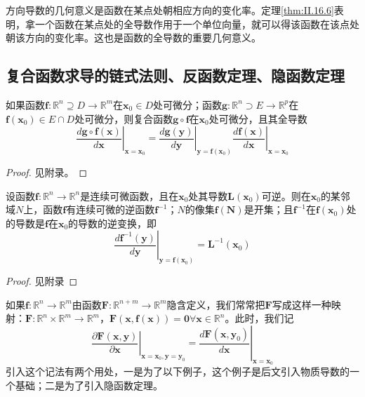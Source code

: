 \documentclass[main.tex]{subfiles}
\begin{document}
方向导数的几何意义是函数在某点处朝相应方向的变化率。定理\ref{thm:II.16.6}表明，拿一个函数在某点处的全导数作用于一个单位向量，就可以得该函数在该点处朝该方向的变化率。这也是函数的全导数的重要几何意义。
\subsection{复合函数求导的链式法则、反函数定理、隐函数定理}
\begin{theorem}[复合函数求导的链式法则]\label{thm:II.12.7}
如果函数$\mathbf{f}:\mathbb{R}^n\supseteq D\rightarrow\mathbb{R}^m$在$\mathbf{x}_0\in D$处可微分；函数$\mathbf{g}:\mathbb{R}^n\supset E\rightarrow\mathbb{R}^p$在$\mathbf{f}\left(\mathbf{x}_0\right)\in E\cap D$处可微分，则复合函数$\mathbf{g}\circ\mathbf{f}$在$\mathbf{x}_0$处可微分，且其全导数
\[
\left.\frac{d\mathbf{g}\circ\mathbf{f}\left(\mathbf{x}\right)}{d\mathbf{x}}\right|_{\mathbf{x}=\mathbf{x}_0}=\left.\frac{d\mathbf{g}\left(\mathbf{y}\right)}{d\mathbf{y}}\right|_{\mathbf{y}=\mathbf{f}\left(\mathbf{x}_0\right)}\left.\frac{d\mathbf{f}\left(\mathbf{x}\right)}{d\mathbf{x}}\right|_{\mathbf{x}=\mathbf{x}_0}
\]
\end{theorem}
\begin{proof}
见附录。
\end{proof}

\begin{theorem}[反函数定理]\label{thm:II.12.8}
设函数$\mathbf{f}:\mathbb{R}^n\rightarrow\mathbb{R}^n$是连续可微函数，且在$\mathbf{x}_0$处其导数$\mathbf{L}\left(\mathbf{x}_0\right)$可逆。则在$\mathbf{x}_0$的某邻域$N$上，函数$\mathbf{f}$有连续可微的逆函数$\mathbf{f}^{-1}$；$N$的像集$\mathbf{f}\left(\mathbf{N}\right)$是开集；且$\mathbf{f}^{-1}$在$\mathbf{f}\left(\mathbf{x}_0\right)$处的导数是$\mathbf{f}$在$\mathbf{x}_0$的导数的逆变换，即
\[\left.\frac{d\mathbf{f}^{-1}\left(\mathbf{y}\right)}{d\mathbf{y}}\right|_{\mathbf{y}=\mathbf{f}\left(\mathbf{x}_0\right)}=\mathbf{L}^{-1}\left(\mathbf{x}_0\right)\]
\end{theorem}
\begin{proof}
见附录
\end{proof}

如果$\mathbf{f}:\mathbb{R}^n\rightarrow\mathbb{R}^m$由函数$\mathbf{F}:\mathbb{R}^{n+m}\rightarrow\mathbb{R}^m$隐含定义，我们常常把$\mathbf{F}$写成这样一种映射：$\mathbf{F}:\mathbb{R}^n\times\mathbb{R}^m\rightarrow\mathbb{R}^m$，$\mathbf{F}\left(\mathbf{x},\mathbf{f}\left(\mathbf{x}\right)\right)=\mathbf{0}\forall\mathbf{x}\in\mathbb{R}^n$。此时，我们记
\[\left.\frac{\partial \mathbf{F}\left(\mathbf{x},\mathbf{y}\right)}{\partial \mathbf{x}}\right|_{\mathbf{x}=\mathbf{x}_0,\mathbf{y}=\mathbf{y}_0}=\left.\frac{d\mathbf{F}\left(\mathbf{x},\mathbf{y}_0\right)}{d\mathbf{x}}\right|_{\mathbf{x}=\mathbf{x}_0}\]
引入这个记法有两个用处，一是为了以下例子，这个例子是后文引入物质导数的一个基础；二是为了引入隐函数定理。
\end{document}
